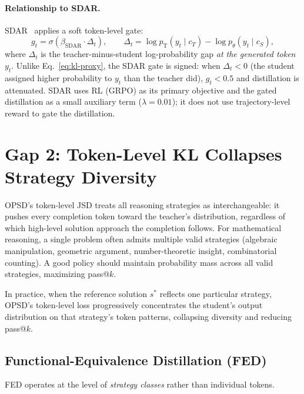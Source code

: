 \documentclass[11pt]{article}
\newcommand{\logpT}{\log p_{\mathrm{T}}}
\begin{document}
\paragraph{Relationship to SDAR.}
SDAR~\cite{sdar2025} applies a soft token-level gate:
\begin{equation}
  g_t = \sigma\!\left(\beta_{\mathrm{SDAR}} \cdot \Delta_t\right),
  \qquad
  \Delta_t = \logpT(y_t \mid c_T) - \log p_\theta(y_t \mid c_S),
  \label{eq:sdar-gate}
\end{equation}
where $\Delta_t$ is the teacher-minus-student log-probability gap \emph{at the generated
token} $y_t$.  Unlike Eq.~\eqref{eq:kl-proxy}, the SDAR gate is signed: when
$\Delta_t < 0$ (the student assigned higher probability to $y_t$ than the teacher did),
$g_t < 0.5$ and distillation is attenuated.  SDAR uses RL (GRPO) as its primary
objective and the gated distillation as a small auxiliary term ($\lambda=0.01$); it does not
use trajectory-level reward to gate the distillation.

\section{Gap 2: Token-Level KL Collapses Strategy Diversity}
\label{sec:fed}

OPSD's token-level JSD treats all reasoning strategies as interchangeable: it pushes every
completion token toward the teacher's distribution, regardless of which high-level solution
approach the completion follows.  For mathematical reasoning, a single problem often admits
multiple valid strategies (algebraic manipulation, geometric argument, number-theoretic
insight, combinatorial counting).  A good policy should maintain probability mass across all
valid strategies, maximizing pass@$k$.

In practice, when the reference solution $s^*$ reflects one particular strategy, OPSD's
token-level loss progressively concentrates the student's output distribution on that
strategy's token patterns, collapsing diversity and reducing pass@$k$.

\subsection{Functional-Equivalence Distillation (FED)}

FED operates at the level of \emph{strategy classes} rather than individual tokens.
\end{document}
